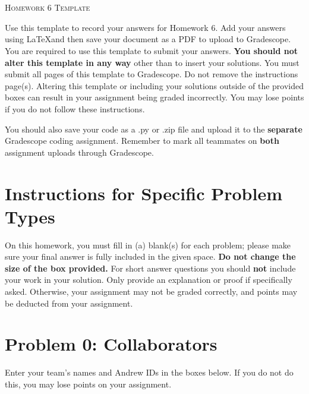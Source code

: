\documentclass[12pt]{article}
\begin{document}
\section*{}
\begin{center}
  \centerline{\textsc{\LARGE  Homework 6 Template}}
\end{center}

Use this template to record your answers for Homework 6.  Add your answers using \LaTeX and then save your document as a PDF to upload to Gradescope.  You are required to use this template to submit your answers.  \textbf{You should not alter this template in any way} other than to insert your solutions.  You must submit all \pageref{LastPage} pages of this template to Gradescope.  Do not remove the instructions page(s).  Altering this template or including your solutions outside of the provided boxes can result in your assignment being graded incorrectly.  You may lose points if you do not follow these instructions.

You should also save your code as a .py or .zip file and upload it to the \textbf{separate} Gradescope coding assignment. Remember to mark all teammates on \textbf{both} assignment uploads through Gradescope.

\section*{Instructions for Specific Problem Types}

On this homework, you must fill in (a) blank(s) for each problem; please make sure your final answer is fully included in the given space.  \textbf{Do not change the size of the box provided.}  For short answer questions you should \textbf{not} include your work in your solution.  Only provide an explanation or proof if specifically asked.  Otherwise, your assignment may not be graded correctly, and points may be deducted from your assignment.

\section*{Problem 0: Collaborators}
Enter your team's names and Andrew IDs in the boxes below.  If you do not do this, you may lose points on your assignment.
\end{document}
